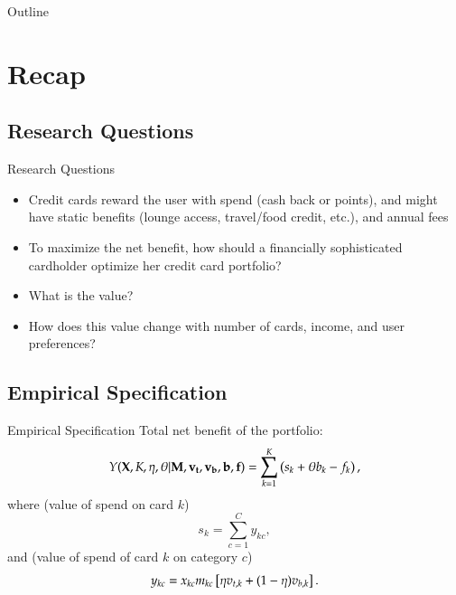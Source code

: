 

\begin{frame}{Outline}
    \tableofcontents
\end{frame}

\section{Recap}

\subsection{Research Questions}

\begin{frame}{Research Questions}
    \begin{itemize}
        \item Credit cards reward the user with spend (cash back or points), and might have static benefits (lounge access, travel/food credit, etc.), and annual fees
        \bigskip
        \item To maximize the net benefit, how should a financially sophisticated cardholder optimize her credit card portfolio?
        \bigskip
        \item What is the value?
        \bigskip
        \item How does this value change with number of cards, income, and user preferences?
    \end{itemize}
\end{frame}    

\subsection{Empirical Specification}

\begin{frame}{Empirical Specification}
Total net benefit of the portfolio:
    \[
        Y(\mathbf{X}, K, \eta, \theta | \mathbf{M}, \mathbf{v_{t}}, \mathbf{v_{b}}, \mathbf{b}, \mathbf{f} ) = \sum_{k=1}^{K}\left( s_{k} + \theta\/ b_{k} - f_{k}\right),
    \]
where (value of spend on card $k$)
\[
    s_{k} = \sum_{c=1}^{C}y_{kc},
\]
and (value of spend of card $k$ on category $c$)
\[
    y_{kc} = x_{kc}\/m_{kc} \left[ \eta\/ v_{t,k} + 
    (1 - \eta)\/ v_{b,k}\right].
\]
\end{frame}    

